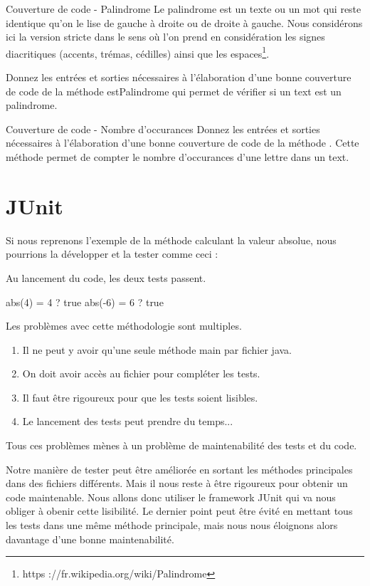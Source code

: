 \documentclass[a4paper,11pt]{article}
\begin{document}
	\begin{Exercice}{Couverture de code - Palindrome}
		Le palindrome est un texte ou un mot qui reste identique qu’on le lise de gauche à droite ou de droite à gauche. Nous considérons ici la version stricte dans le sens où l’on prend en considération les signes diacritiques (accents, trémas, cédilles) ainsi que les espaces\footnote{https ://fr.wikipedia.org/wiki/Palindrome}.

		Donnez les entrées et sorties nécessaires à l’élaboration d’une bonne couverture de code de la méthode estPalindrome qui permet de vérifier si un text est un palindrome.
	\end{Exercice}

	\begin{Exercice}{Couverture de code - Nombre d'occurances}
		Donnez les entrées et sorties nécessaires à l’élaboration d’une bonne couverture de code de la méthode . Cette méthode permet de compter le nombre d’occurances d’une lettre dans un text.
	\end{Exercice}

\section{JUnit}

	Si nous reprenons l’exemple de la méthode calculant la valeur absolue, nous pourrions la développer et la tester comme ceci :

	Au lancement du code, les deux tests passent.
	\begin{Console}
		abs(4) = 4 ? true
		abs(-6) = 6 ? true
	\end{Console}

	Les problèmes avec cette méthodologie sont multiples.
	\begin{enumerate}
		\item Il ne peut y avoir qu’une seule méthode main par fichier java.
 		\item On doit avoir accès au fichier pour compléter les tests.
 		\item Il faut être rigoureux pour que les tests soient lisibles.
 		\item Le lancement des tests peut prendre du temps...
	\end{enumerate}
	Tous ces problèmes mènes à un problème de maintenabilité des tests et du code.

	Notre manière de tester peut être améliorée en sortant les méthodes principales dans des fichiers différents. Mais il nous reste à être rigoureux pour obtenir un code maintenable. Nous allons donc utiliser le framework JUnit qui va nous obliger à obenir cette lisibilité. Le dernier point peut être évité en mettant tous les tests dans une même méthode principale, mais nous nous éloignons alors davantage d'une bonne maintenabilité.
\end{document}
